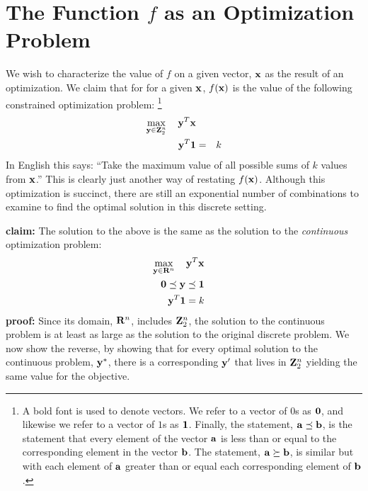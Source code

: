 \documentclass[12pt]{article}
\begin{document}
\section{The Function $f$ as an Optimization Problem}
We wish to characterize the value of $f$ on a given vector, ${\bf x}$ as 
the result of an optimization.
We claim that for for a given ${\bf x}$, $f({\bf x})$ is the value of 
the following constrained optimization problem:%
\footnote{A bold font is used to denote vectors. We refer to a  
vector of $0$s as ${\bf 0}$, and likewise we refer to a vector of $1$s
as ${\bf 1}$. Finally, the statement, ${\bf a} \preceq {\bf b}$, is the 
statement that every element of the vector ${\bf a}$ is less than or equal
to the corresponding element in the vector ${\bf b}$. The statement,
${\bf a} \succeq {\bf b}$, is similar but with each element of ${\bf a}$
greater than or equal each corresponding element of ${\bf b}$.
}
\begin{eqnarray}
\mathop{\rm max}_{{\bf y} \in {\bf Z}_2^n}\limits \quad {\bf y}^T {\bf x} && \\
{\bf y}^T {\bf 1} & = & k 
\end{eqnarray}
In English this says: ``Take the maximum value of all possible sums of $k$ 
values from ${\bf x}$.'' This is clearly just another way of restating $f({\bf x})$.
Although this optimization is succinct, there are still an exponential number 
of combinations to examine to find the optimal solution in this discrete setting.

{\bf claim:} The solution to the above is the same as the solution to the 
{\it continuous\/} optimization problem: 
\begin{eqnarray}
\mathop{\rm max}_{{\bf y} \in {\bf R}^n}\limits \quad {\bf y}^T {\bf x} &&  \\
{\bf 0} \preceq {\bf y}   \preceq  {\bf 1}&& \label{bound} \\ 
{\bf y}^T {\bf 1}  =  k && \label{integral} 
\end{eqnarray}
{\bf proof:}
Since its domain, ${\bf R}^n$, 
includes ${\bf Z}_2^n$, the solution to the continuous problem is at least as 
large as the solution to the original discrete problem.
We now show the reverse, by showing that for every optimal solution to the 
continuous problem, ${\bf y}^*$, there is a corresponding ${\bf y}^\prime$ that 
lives in ${\bf Z}_2^n$ yielding the same value for the objective.
\end{document}
